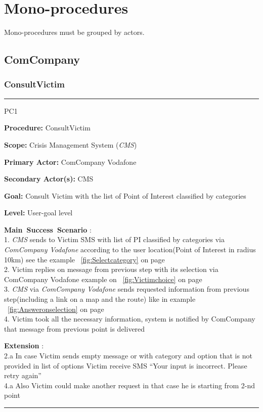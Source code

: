 \section{Mono-procedures}
Mono-procedures must be grouped by actors.

\subsection{ComCompany}

\subsubsection{ConsultVictim}

\vspace{0.5cm}
\hrule
\begin{lyxlist}{PC1}
\small{
\item [\textbf{Procedure:}] ConsultVictim
\item [\textbf{Scope:}] Crisis Management System (\emph{CMS})
\item [\textbf{Primary Actor:}] ComCompany Vodafone
\item [\textbf{Secondary Actor(s):}] CMS
\item [\textbf{Goal:}] Consult Victim with the list of Point of Interest
classified by categories
\item [\textbf{Level:}] User-goal level 

\item [\textbf{Main~Success~Scenario}]:\\
1. \emph{CMS} sends to Victim SMS with list of PI classified by categories via
\emph{ComCompany Vodafone} according to the user location(Point of Interest in radius 10km) see the example ~\ref{fig:Selectcategory} on page~\pageref{fig:Selectcategory}\\
2. Victim replies on message from previous step with its selection via
ComCompany Vodafone example on ~\ref{fig:Victimchoice} on page~\pageref{fig:Victimchoice}\\
3. \emph{CMS} via \emph{ComCompany Vodafone} sends requested information from
previous step(including a link on a map and the route) like in example ~\ref{fig:Answeronselection} on page~\pageref{fig:Answeronselection}\\
4. Victim took all the necessary information, system is notified by ComCompany 
that message from previous point is delivered\\

\item [\textbf{Extension}]:\\ 
2.a In case Victim sends empty message or with category and option that is not
provided in list of options Victim receive SMS ``Your input is incorrect. Please
retry again''\\
4.a Also Victim could make another request in that case he is starting from 2-nd
point\\
}
\end{lyxlist}
\hrule
\vspace{0.5cm}

